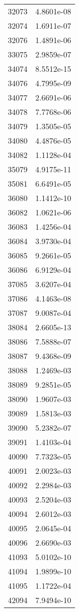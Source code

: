 \begin{table}[h!]
\begin{tabular}{|| c || c |}
32073 & 4.8601e-08 \\
32074 & 1.6911e-07 \\
32076 & 1.4891e-06 \\
33075 & 2.9859e-07 \\
34074 & 8.5512e-15 \\
34076 & 4.7995e-09 \\
34077 & 2.6691e-06 \\
34078 & 7.7768e-06 \\
34079 & 1.3505e-05 \\
34080 & 4.4876e-05 \\
34082 & 1.1128e-04 \\
35079 & 4.9175e-11 \\
35081 & 6.6491e-05 \\
36080 & 1.1412e-10 \\
36082 & 1.0621e-06 \\
36083 & 1.4256e-04 \\
36084 & 3.9730e-04 \\
36085 & 9.2661e-05 \\
36086 & 6.9129e-04 \\
37085 & 3.6207e-04 \\
37086 & 4.1463e-08 \\
37087 & 9.0087e-04 \\
38084 & 2.6605e-13 \\
38086 & 7.5888e-07 \\
38087 & 9.4368e-09 \\
38088 & 1.2469e-03 \\
38089 & 9.2851e-05 \\
38090 & 1.9607e-03 \\
39089 & 1.5813e-03 \\
39090 & 5.2382e-07 \\
39091 & 1.4103e-04 \\
40090 & 7.7323e-05 \\
40091 & 2.0023e-03 \\
40092 & 2.2984e-03 \\
40093 & 2.5204e-03 \\
40094 & 2.6012e-03 \\
40095 & 2.0645e-04 \\
40096 & 2.6690e-03 \\
41093 & 5.0102e-10 \\
41094 & 1.9899e-10 \\
41095 & 1.1722e-04 \\
42094 & 7.9494e-10 \\

\end{tabular}
\end{table}
